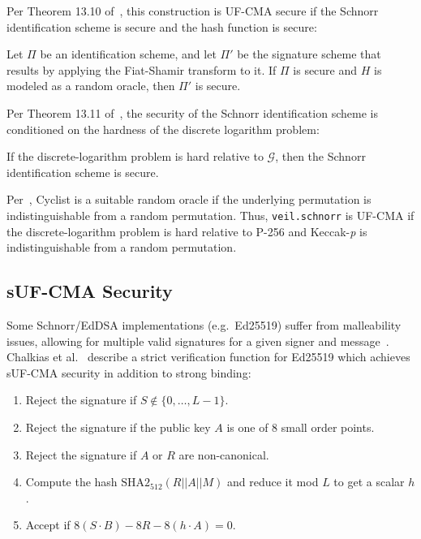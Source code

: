 Per Theorem 13.10 of~\cite[p. 478]{katz2020}, this construction is UF-CMA secure if the Schnorr identification scheme
is secure and the hash function is secure:

\begin{displayquote}
    Let $\Pi$ be an identification scheme, and let $\Pi'$ be the signature scheme that results by applying the
    Fiat-Shamir transform to it.
    If $\Pi$ is secure and $H$ is modeled as a random oracle, then $\Pi'$ is secure.
\end{displayquote}

Per Theorem 13.11 of~\cite[p. 481]{katz2020}, the security of the Schnorr identification scheme is conditioned on the
hardness of the discrete logarithm problem:

\begin{displayquote}
    If the discrete-logarithm problem is hard relative to $\mathcal{G}$, then the Schnorr identification scheme is
    secure.
\end{displayquote}

Per~\cite[Sec. 5.10]{bertoni2011sponge}, Cyclist is a suitable random oracle if the underlying permutation is
indistinguishable from a random permutation.
Thus, \texttt{veil.schnorr} is UF-CMA if the discrete-logarithm problem is hard relative to P-256 and Keccak-\emph{p} is
indistinguishable from a random permutation.

\subsection{sUF-CMA Security}\label{subsec:veil.schnorr-suf-cma}

Some Schnorr/EdDSA implementations (e.g.\ Ed25519) suffer from malleability issues, allowing for multiple valid
signatures for a given signer and message~\cite{brendel2021}.
Chalkias et al.~\cite{chalkias2020} describe a strict verification function for Ed25519 which achieves sUF-CMA security
in addition to strong binding:

\begin{displayquote}
    \begin{enumerate}
        \item Reject the signature if $S \not\in \{0,\ldots,L-1\}$.
        \item Reject the signature if the public key $A$ is one of 8 small order points.
        \item Reject the signature if $A$ or $R$ are non-canonical.
        \item Compute the hash $\text{SHA2}_{512}(R||A||M)$ and reduce it mod $L$ to get a scalar $h$.
        \item Accept if $8(S \cdot B)-8R-8(h \cdot A)=0$.
    \end{enumerate}
\end{displayquote}

